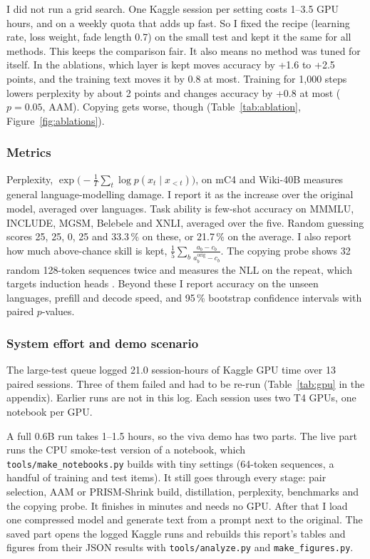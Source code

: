 \documentclass[11pt]{article}
\begin{document}
I did not run a grid search. One Kaggle session per setting costs 1--3.5 GPU hours, and on a weekly quota that adds
up fast. So I fixed the recipe (learning rate, loss weight, fade length 0.7) on the small test and kept it the same
for all methods. This keeps the comparison fair. It also means no method was tuned for itself. In the ablations,
which layer is kept moves accuracy by +1.6 to +2.5 points, and the training text moves it by 0.8 at most. Training
for 1{,}000 steps lowers perplexity by about 2 points and changes accuracy by +0.8 at most ($p=0.05$, AAM). Copying
gets worse, though (Table~\ref{tab:ablation}, Figure~\ref{fig:ablations}).

\subsubsection{Metrics}

Perplexity, $\exp\big(-\frac{1}{T}\sum_t \log p(x_t\mid x_{<t})\big)$, on mC4 and Wiki-40B measures general
language-modelling damage. I report it as the increase over the original model, averaged over languages. Task
ability is few-shot accuracy on MMMLU, INCLUDE, MGSM, Belebele and XNLI, averaged over the five. Random guessing
scores 25, 25, 0, 25 and 33.3\,\% on these, or 21.7\,\% on the average. I also report how much above-chance skill is
kept, $\frac{1}{5}\sum_b \frac{a_b - c_b}{a^{\text{orig}}_b - c_b}$. The copying probe shows 32 random 128-token
sequences twice and measures the NLL on the repeat, which targets induction heads \citep{olsson2022}. Beyond these I
report accuracy on the unseen languages, prefill and decode speed, and 95\,\% bootstrap confidence intervals with
paired $p$-values.

\subsubsection{System effort and demo scenario}

The large-test queue logged 21.0 session-hours of Kaggle GPU time over 13 paired sessions. Three of them failed and
had to be re-run (Table~\ref{tab:gpu} in the appendix). Earlier runs are not in this log. Each session uses two T4
GPUs, one notebook per GPU.

A full 0.6B run takes 1--1.5 hours, so the viva demo has two parts. The live part runs the CPU smoke-test version of
a notebook, which \texttt{tools/make\_notebooks.py} builds with tiny settings (64-token sequences, a handful of
training and test items). It still goes through every stage: pair selection, AAM or PRISM-Shrink build, distillation,
perplexity, benchmarks and the copying probe. It finishes in minutes and needs no GPU. After that I load one
compressed model and generate text from a prompt next to the original. The saved part opens the logged Kaggle runs
and rebuilds this report's tables and figures from their JSON results with \texttt{tools/analyze.py} and
\texttt{make\_figures.py}.
\end{document}
